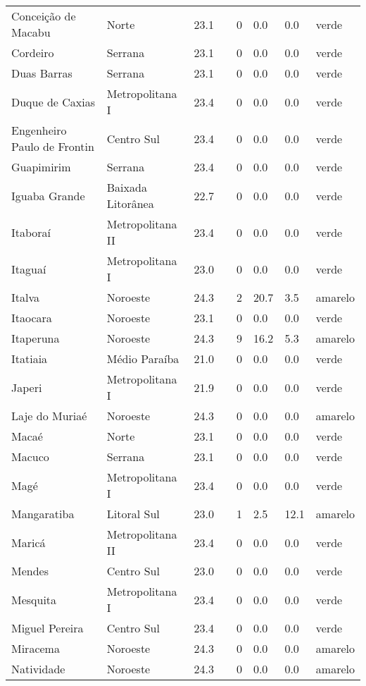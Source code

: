 \begin{longtable}{l|lllllll}
  Conceição de Macabu & Norte & 23.1 &  & 0 & 0.0 & 0.0 & verde \\ 
  Cordeiro & Serrana & 23.1 &  & 0 & 0.0 & 0.0 & verde \\ 
  Duas Barras & Serrana & 23.1 &  & 0 & 0.0 & 0.0 & verde \\ 
  Duque de Caxias & Metropolitana I & 23.4 &  & 0 & 0.0 & 0.0 & verde \\ 
  Engenheiro Paulo de Frontin & Centro Sul & 23.4 &  & 0 & 0.0 & 0.0 & verde \\ 
  Guapimirim & Serrana & 23.4 &  & 0 & 0.0 & 0.0 & verde \\ 
  Iguaba Grande & Baixada Litorânea & 22.7 &  & 0 & 0.0 & 0.0 & verde \\ 
  Itaboraí & Metropolitana II & 23.4 &  & 0 & 0.0 & 0.0 & verde \\ 
  Itaguaí & Metropolitana I & 23.0 &  & 0 & 0.0 & 0.0 & verde \\ 
  Italva & Noroeste & 24.3 &  & 2 & 20.7 & 3.5 & amarelo \\ 
  Itaocara & Noroeste & 23.1 &  & 0 & 0.0 & 0.0 & verde \\ 
  Itaperuna & Noroeste & 24.3 &  & 9 & 16.2 & 5.3 & amarelo \\ 
  Itatiaia & Médio Paraíba & 21.0 &  & 0 & 0.0 & 0.0 & verde \\ 
  Japeri & Metropolitana I & 21.9 &  & 0 & 0.0 & 0.0 & verde \\ 
  Laje do Muriaé & Noroeste & 24.3 &  & 0 & 0.0 & 0.0 & amarelo \\ 
  Macaé & Norte & 23.1 &  & 0 & 0.0 & 0.0 & verde \\ 
  Macuco & Serrana & 23.1 &  & 0 & 0.0 & 0.0 & verde \\ 
  Magé & Metropolitana I & 23.4 &  & 0 & 0.0 & 0.0 & verde \\ 
  Mangaratiba & Litoral Sul & 23.0 &  & 1 & 2.5 & 12.1 & amarelo \\ 
  Maricá & Metropolitana II & 23.4 &  & 0 & 0.0 & 0.0 & verde \\ 
  Mendes & Centro Sul & 23.0 &  & 0 & 0.0 & 0.0 & verde \\ 
  Mesquita & Metropolitana I & 23.4 &  & 0 & 0.0 & 0.0 & verde \\ 
  Miguel Pereira & Centro Sul & 23.4 &  & 0 & 0.0 & 0.0 & verde \\ 
  Miracema & Noroeste & 24.3 &  & 0 & 0.0 & 0.0 & amarelo \\ 
  Natividade & Noroeste & 24.3 &  & 0 & 0.0 & 0.0 & amarelo \\ 

\end{longtable}
